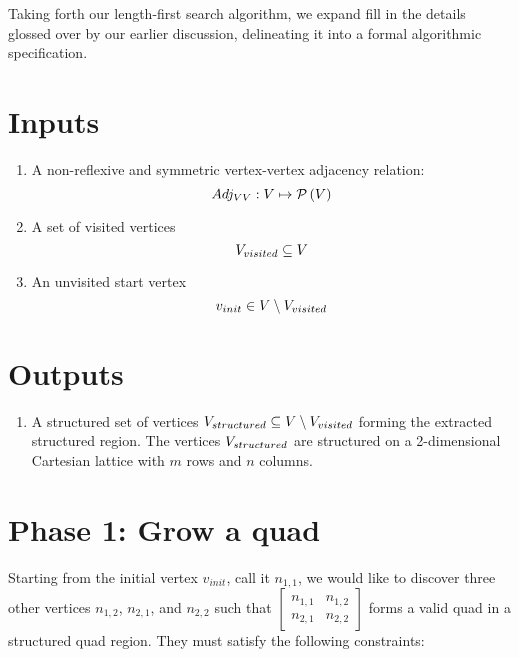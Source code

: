 \label{chap:detect-quad-grid}
Taking forth our length-first search algorithm, we expand fill in the details glossed over by our earlier discussion, delineating it into a formal algorithmic specification.

\newcommand{\vinit}{v_{init}}

\newcommand{\Quad}[4]{\begin{bmatrix} #1 & #2 \\ #3 & #4 \end{bmatrix}}

\newcommand{\Qinit}{\Quad{n_{1,1}} {n_{1,2}} {n_{2,1}} {n_{2,2}} }

\newcommand{\Qinitmirror}{\Quad {n_{1,2}} {n_{1,1}} {n_{2,2}} {n_{2,1}}}



\section{Inputs}
\begin{enumerate}
\item A non-reflexive and symmetric vertex-vertex adjacency relation:
$$ Adj_{VV}: V \mapsto \mathcal P \left({V}\right) $$

\item A set of visited vertices
$$ V_{visited} \subseteq V $$

\item An unvisited start vertex
$$ \vinit \in \VertexSet \setminus \Visited $$
\end{enumerate}


\section{Outputs}
\begin{enumerate}
\item A structured set of vertices $V_{structured} \subseteq V \setminus V_{visited} $ forming the extracted structured region.
The vertices $V_{structured}$ are structured on a 2-dimensional Cartesian lattice with $m$ rows and $n$ columns.
\end{enumerate}



\section{Phase 1: Grow a quad}
\label{sec:grow_a_quad}
Starting from the initial vertex $\vinit$, call it $n_{1,1}$, we would like to discover three other vertices $n_{1,2}$, $n_{2,1}$, and $n_{2,2}$ such that $\Qinit$ forms a valid quad in a structured quad region. They must satisfy the following constraints:

